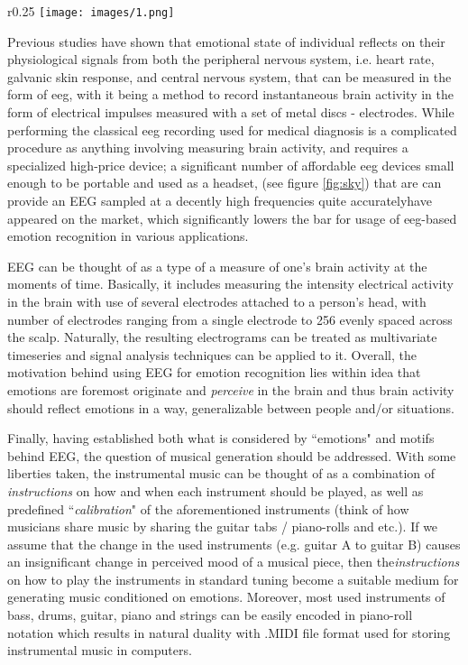 \documentclass[14pt]{extreport}
\begin{document}
\begin{wrapfigure}{r}{0.25\textwidth}
    \centering
\texttt{[image: images/1.png]}
\caption{EEG headset by NeuroSky}
\label{fig:sky}
\end{wrapfigure}

Previous studies have shown that emotional state of individual reflects on their physiological signals from both the peripheral nervous system, i.e. heart rate, galvanic skin response, and central nervous system, that can be measured in the form of \acrfull{eeg}, with it being a method to record instantaneous brain activity in the form of electrical impulses measured with a set of metal discs - electrodes. While performing the classical \acrshort{eeg} recording used for medical diagnosis is a complicated procedure as anything involving measuring brain activity, and requires a specialized high-price device; a significant number of affordable \acrshort{eeg} devices small enough to be portable and used as a headset, (see figure \ref{fig:sky}) that are can provide an EEG sampled at a decently high frequencies quite accuratelyhave appeared on the market, which significantly lowers the bar for usage of \acrshort{eeg}-based emotion recognition in various applications.

EEG can be thought of as a type of a measure of one's brain activity at the moments of time. Basically, it includes measuring the intensity electrical activity in the brain with use of several electrodes attached to a person's head, with number of electrodes ranging from a single electrode to 256 evenly spaced across the scalp. Naturally, the resulting electrograms can be treated as multivariate timeseries and signal analysis techniques can be applied to it. Overall, the motivation behind using EEG for emotion recognition lies within idea that emotions are foremost originate and \emph{perceive} in the brain and thus brain activity should reflect emotions in a way, generalizable between people and/or situations.

Finally, having established both what is considered by ``emotions" and motifs behind EEG, the question of musical generation should be addressed. With some liberties taken, the instrumental music can be thought of as a combination of \emph{instructions} on how and when each instrument should be played, as well as predefined ``\emph{calibration}" of the aforementioned instruments (think of how musicians share music by sharing the guitar tabs / piano-rolls and etc.). If we assume that the change in the used instruments (e.g. guitar A to guitar B) causes an insignificant change in perceived mood of a musical piece, then the\emph{instructions} on how to play the instruments in standard tuning become a suitable medium for generating music conditioned on emotions. Moreover, most used instruments of bass, drums, guitar, piano and strings can be easily encoded in piano-roll notation which results in natural duality with .MIDI file format used for storing instrumental music in computers.
\end{document}
